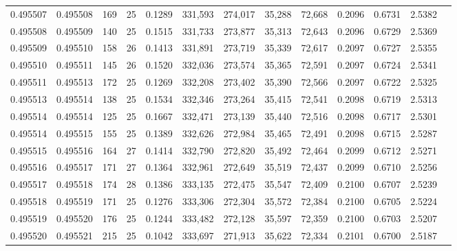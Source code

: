 \begin{tabular}{rrrrrrrrrrrrr}
0.495507 & 0.495508 & 169 &  25 &                                     0.1289 & 331,593 & 274,017 &  35,288 &  72,668 & 0.2096 & 0.6731 & 2.5382 \\
0.495508 & 0.495509 & 140 &  25 &                                     0.1515 & 331,733 & 273,877 &  35,313 &  72,643 & 0.2096 & 0.6729 & 2.5369 \\
0.495509 & 0.495510 & 158 &  26 &                                     0.1413 & 331,891 & 273,719 &  35,339 &  72,617 & 0.2097 & 0.6727 & 2.5355 \\
0.495510 & 0.495511 & 145 &  26 &                                     0.1520 & 332,036 & 273,574 &  35,365 &  72,591 & 0.2097 & 0.6724 & 2.5341 \\
0.495511 & 0.495513 & 172 &  25 &                                     0.1269 & 332,208 & 273,402 &  35,390 &  72,566 & 0.2097 & 0.6722 & 2.5325 \\
0.495513 & 0.495514 & 138 &  25 &                                     0.1534 & 332,346 & 273,264 &  35,415 &  72,541 & 0.2098 & 0.6719 & 2.5313 \\
0.495514 & 0.495514 & 125 &  25 &                                     0.1667 & 332,471 & 273,139 &  35,440 &  72,516 & 0.2098 & 0.6717 & 2.5301 \\
0.495514 & 0.495515 & 155 &  25 &                                     0.1389 & 332,626 & 272,984 &  35,465 &  72,491 & 0.2098 & 0.6715 & 2.5287 \\
0.495515 & 0.495516 & 164 &  27 &                                     0.1414 & 332,790 & 272,820 &  35,492 &  72,464 & 0.2099 & 0.6712 & 2.5271 \\
0.495516 & 0.495517 & 171 &  27 &                                     0.1364 & 332,961 & 272,649 &  35,519 &  72,437 & 0.2099 & 0.6710 & 2.5256 \\
0.495517 & 0.495518 & 174 &  28 &                                     0.1386 & 333,135 & 272,475 &  35,547 &  72,409 & 0.2100 & 0.6707 & 2.5239 \\
0.495518 & 0.495519 & 171 &  25 &                                     0.1276 & 333,306 & 272,304 &  35,572 &  72,384 & 0.2100 & 0.6705 & 2.5224 \\
0.495519 & 0.495520 & 176 &  25 &                                     0.1244 & 333,482 & 272,128 &  35,597 &  72,359 & 0.2100 & 0.6703 & 2.5207 \\
0.495520 & 0.495521 & 215 &  25 &                                     0.1042 & 333,697 & 271,913 &  35,622 &  72,334 & 0.2101 & 0.6700 & 2.5187 \\

\end{tabular}
